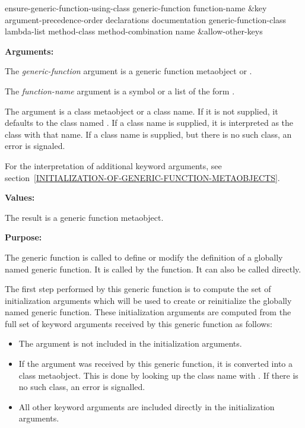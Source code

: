 \begin{defun}
ensure-generic-function-using-class generic-function function-name 
  &key argument-precedence-order declarations documentation
  generic-function-class lambda-list method-class method-combination name
  &allow-other-keys

\textbf{Arguments:}

The \emph{generic-function} argument is a generic function metaobject or .

The \emph{function-name} argument is a symbol or a list of the form .

The  argument is a class metaobject or a class
name. If it is not supplied, it defaults to the class named
. If a class name is supplied, it is interpreted
as the class with that name. If a class name is supplied, but there is no such
class, an error is signaled.

For the interpretation of additional keyword arguments, see
section~\ref{INITIALIZATION-OF-GENERIC-FUNCTION-METAOBJECTS}.

\textbf{Values:}

The result is a generic function metaobject.

\textbf{Purpose:}

The generic function  is called to
define or modify the definition of a globally named generic function. It is
called by the  function. It can also be called
directly.

The first step performed by this generic function is to compute the set of
initialization arguments which will be used to create or reinitialize the
globally named generic function. These initialization arguments are computed
from the full set of keyword arguments received by this generic function as
follows:

\begin{itemize}
\item The  argument is not included in the
  initialization arguments.
\item If the  argument was received by this generic function,
  it is converted into a class metaobject. This is done by looking up the class
  name with . If there is no such class, an error is signalled.
\item All other keyword arguments are included directly in the initialization
  arguments.
\end{itemize}


\end{defun}
